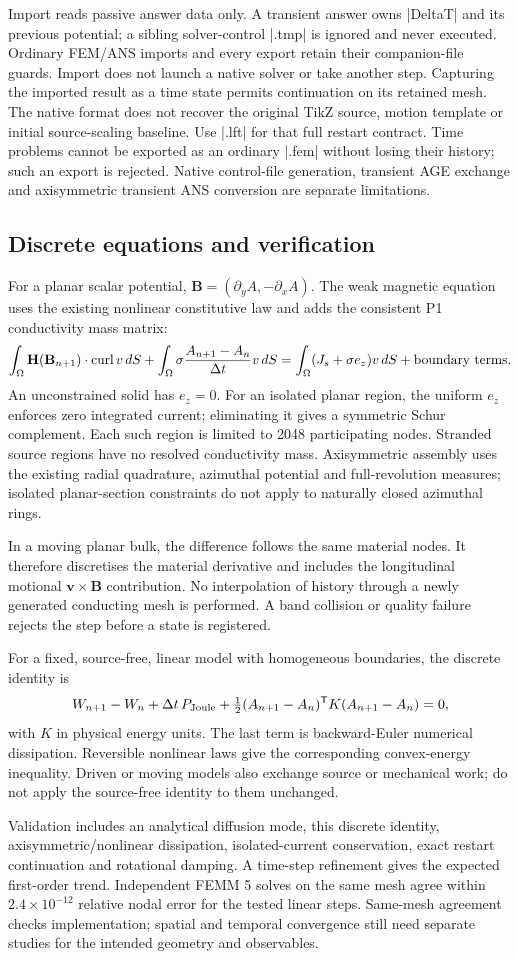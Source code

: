 Import reads passive answer data only. A transient answer owns |DeltaT| and its
previous potential; a sibling solver-control |.tmp| is ignored and never executed.
Ordinary FEM/ANS imports and every export retain their companion-file guards.
Import does not launch a native solver or take another step. Capturing the
imported result as a time state permits continuation on its retained mesh.
The native format does not recover the original TikZ source, motion template or
initial source-scaling baseline. Use |.lft| for that full restart contract.
Time problems cannot be exported as an ordinary |.fem| without losing their
history; such an export is rejected. Native control-file generation, transient
AGE exchange and axisymmetric transient ANS conversion are separate limitations.

\subsection{Discrete equations and verification}
For a planar scalar potential, $\mathbf B=(\partial_y A,-\partial_x A)$.
The weak magnetic equation uses the existing nonlinear constitutive law and
adds the consistent P1 conductivity mass matrix:
\[
 \int_\Omega \mathbf H(\mathbf B_{n+1})\cdot\operatorname{curl}v\,dS
 +\int_\Omega\sigma\frac{A_{n+1}-A_n}{\Delta t}v\,dS
 =\int_\Omega(J_s+\sigma e_z)v\,dS+\hbox{boundary terms}.
\]
An unconstrained solid has $e_z=0$. For an isolated planar region, the uniform
$e_z$ enforces zero integrated current; eliminating it gives a symmetric Schur
complement. Each such region is limited to 2048 participating nodes. Stranded
source regions have no resolved conductivity mass. Axisymmetric assembly uses
the existing radial quadrature, azimuthal potential and full-revolution measures;
isolated planar-section constraints do not apply to naturally closed azimuthal rings.

In a moving planar bulk, the difference follows the same material nodes. It
therefore discretises the material derivative and includes the longitudinal
motional $\mathbf v\times\mathbf B$ contribution. No interpolation of history
through a newly generated conducting mesh is performed. A band collision or
quality failure rejects the step before a state is registered.

For a fixed, source-free, linear model with homogeneous boundaries, the discrete
identity is
\[
 W_{n+1}-W_n+\Delta t\,P_{\rm Joule}
 +\tfrac12(A_{n+1}-A_n)^\mathsf{T}K(A_{n+1}-A_n)=0,
\]
with $K$ in physical energy units. The last term is backward-Euler numerical
dissipation. Reversible nonlinear laws give the corresponding convex-energy
inequality. Driven or moving models also exchange source or mechanical work;
do not apply the source-free identity to them unchanged.

Validation includes an analytical diffusion mode, this discrete identity,
axisymmetric/nonlinear dissipation, isolated-current conservation, exact restart
continuation and rotational damping. A time-step refinement gives the expected
first-order trend. Independent FEMM 5 solves on the same mesh agree within
$2.4\times10^{-12}$ relative nodal error for the tested linear steps. Same-mesh
agreement checks implementation; spatial and temporal convergence still need
separate studies for the intended geometry and observables.
